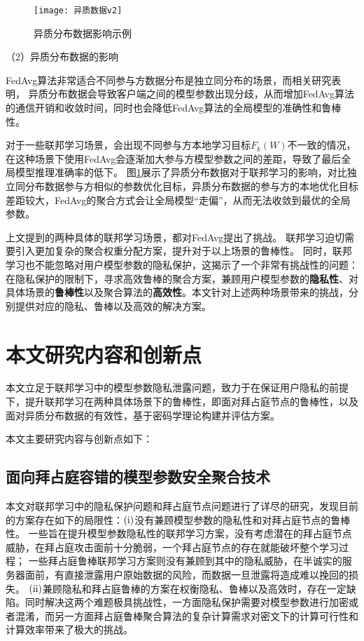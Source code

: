 \begin{figure}[htbp]
	\centering
	\texttt{[image: 异质数据v2]}
	\caption{异质分布数据影响示例}
	\label{non-iid}
\end{figure}

（2）异质分布数据的影响

FedAvg算法非常适合不同参与方数据分布是独立同分布的场景，而相关研究\cite{zhao2018federated}表明，
异质分布数据会导致客户端之间的模型参数出现分歧，从而增加FedAvg算法的通信开销和收敛时间，同时也会降低FedAvg算法的全局模型的准确性和鲁棒性。

对于一些联邦学习场景，会出现不同参与方本地学习目标$F_k(W)$不一致的情况，在这种场景下使用FedAvg会逐渐加大参与方模型参数之间的差距，导致了最后全局模型推理准确率的低下。
图\ref{non-iid}展示了异质分布数据对于联邦学习的影响，对比独立同分布数据参与方相似的参数优化目标，异质分布数据的参与方的本地优化目标差距较大，FedAvg的聚合方式会让全局模型“走偏”，从而无法收敛到最优的全局参数。

上文提到的两种具体的联邦学习场景，都对FedAvg提出了挑战。
联邦学习迫切需要引入更加复杂的聚合权重分配方案，提升对于以上场景的鲁棒性。
同时，联邦学习也不能忽略对用户模型参数的隐私保护，这揭示了一个非常有挑战性的问题：
在隐私保护的限制下，寻求高效鲁棒的聚合方案，兼顾用户模型参数的\textbf{隐私性}、对具体场景的\textbf{鲁棒性}以及聚合算法的\textbf{高效性}。本文针对上述两种场景带来的挑战，分别提供对应的隐私、鲁棒以及高效的解决方案。

\section{本文研究内容和创新点}
本文立足于联邦学习中的模型参数隐私泄露问题，致力于在保证用户隐私的前提下，提升联邦学习在两种具体场景下的鲁棒性，即面对拜占庭节点的鲁棒性，以及面对异质分布数据的有效性，基于密码学理论构建并评估方案。

本文主要研究内容与创新点如下：

\subsection{面向拜占庭容错的模型参数安全聚合技术}
本文对联邦学习中的隐私保护问题和拜占庭节点问题进行了详尽的研究，发现目前的方案存在如下的局限性：$(\rm \romannumeral1)$没有兼顾模型参数的隐私性和对拜占庭节点的鲁棒性。
一些旨在提升模型参数隐私性的联邦学习方案，没有考虑潜在的拜占庭节点威胁，在拜占庭攻击面前十分脆弱，一个拜占庭节点的存在就能破坏整个学习过程；
一些拜占庭鲁棒联邦学习方案则没有兼顾到其中的隐私威胁，在半诚实的服务器面前，有直接泄露用户原始数据的风险，而数据一旦泄露将造成难以挽回的损失。
$(\rm \romannumeral2)$兼顾隐私和拜占庭鲁棒的方案在权衡隐私、鲁棒以及高效时，存在一定缺陷。同时解决这两个难题极具挑战性，一方面隐私保护需要对模型参数进行加密或者混淆，而另一方面拜占庭鲁棒聚合算法的复杂计算需求对密文下的计算可行性和计算效率带来了极大的挑战。

